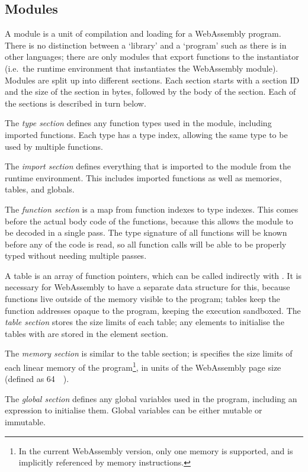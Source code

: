 \documentclass[00-main.tex]{subfiles}
\begin{document}
\subsection{Modules}

A module is a unit of compilation and loading for a WebAssembly program.
There is no distinction between a `library' and a `program' such as there is in other languages; there are only modules that export functions to the instantiator (i.e.\ the runtime environment that instantiates the WebAssembly module).
Modules are split up into different sections.
Each section starts with a section ID and the size of the section in bytes, followed by the body of the section.
Each of the sections is described in turn below.

The \emph{type section} defines any function types used in the module, including imported functions.
Each type has a type index, allowing the same type to be used by multiple functions.

The \emph{import section} defines everything that is imported to the module from the runtime environment.
This includes imported functions as well as memories, tables, and globals.

The \emph{function section} is a map from function indexes to type indexes.
This comes before the actual body code of the functions, because this allows the module to be decoded in a single pass.
The type signature of all functions will be known before any of the code is read, so all function calls will be able to be properly typed without needing multiple passes.

A table is an array of function pointers, which can be called indirectly with .
It is necessary for WebAssembly to have a separate data structure for this, because functions live outside of the memory visible to the program; tables keep the function addresses opaque to the program, keeping the execution sandboxed.
The \emph{table section} stores the size limits of each table; any elements to initialise the tables with are stored in the element section.

The \emph{memory section} is similar to the table section; is specifies the size limits of each linear memory of the program\footnote{In the current WebAssembly version, only one memory is supported, and is implicitly referenced by memory instructions.}, in units of the WebAssembly page size (defined as \SI{64}{\kibi\byte}).

The \emph{global section} defines any global variables used in the program, including an expression to initialise them. Global variables can be either mutable or immutable.
\end{document}

